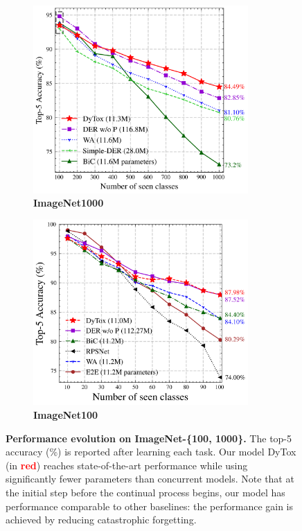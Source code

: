 \begin{figure}
    \centering
    \begin{subfigure}{.5\textwidth}
        \centering
        \includegraphics[width=0.9\textwidth]{images/dytox/imagenet1000.png}
        \caption{\textbf{ImageNet1000}}
        \label{fig:dytox_imagenet1000}
    \end{subfigure}%
    \begin{subfigure}{.5\textwidth}
        \centering
        \includegraphics[width=0.9\textwidth]{images/dytox/imagenet100.png}
        \caption{\textbf{ImageNet100}}
        \label{fig:dytox_imagenet100}
    \end{subfigure}
    \caption{\textbf{Performance evolution on ImageNet-\{100, 1000\}.} The top-5 accuracy (\%) is
        reported after learning each task. Our model DyTox (in \textbf{\textcolor{red}{red}}) reaches
        state-of-the-art performance while using significantly fewer parameters than concurrent models.
        Note that at the initial step before the continual process begins, our model has performance
        comparable to other baselines: the performance gain is achieved by reducing catastrophic
        forgetting.}
    \label{fig:dytox_imagenet}
\end{figure}


